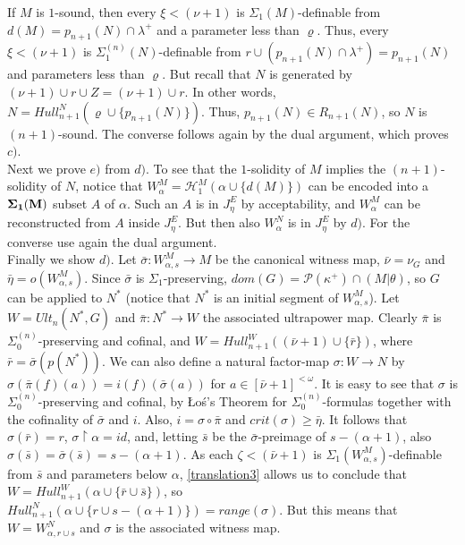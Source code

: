 \documentclass[12pt]{article}
\begin{document}
If $M$ is $1$-sound, then every $\xi < (\nu + 1)$ is $\Sigma_1 (M)$-definable from $d(M) = p_{n+1} (N) \cap \lambda^+$ and a parameter less than $\varrho$.  Thus, every $\xi < (\nu + 1)$ is $\Sigma_1^{(n)}(N)$-definable from $r \cup (p_{n+1} (N) \cap \lambda^+) = p_{n+1}(N)$ and parameters less than $\varrho$. But recall that $N$ is generated by $(\nu + 1) \cup r \cup Z = (\nu + 1) \cup r$.  In other words, $N = Hull_{n+1}^N ( \varrho \cup \{ p_{n+1} (N) \} )$.  Thus, $p_{n+1} (N) \in R_{n+1}(N)$, so $N$ is $(n + 1)$-sound.  The converse follows again by the dual argument, which proves $c)$.\\



Next we prove $e)$ from $d)$.  To see that the $1$-solidity of $M$ implies the $(n+1)$-solidity of $N$, notice that $W_{\alpha}^M = \mathcal{H}_1^M (\alpha \cup \{ d(M) \} )$ can be encoded into a $\bf{\Sigma_1} (M)$ subset $A$ of $\alpha$.  Such an $A$ is in $J_{\eta}^E$ by acceptability, and $W_{\alpha}^M$ can be reconstructed from $A$ inside $J_{\eta}^E$.  But then also $W_{\alpha}^N$ is in $J_{\eta}^E$ by $d)$.  For the converse use again the dual argument.\\



Finally we show $d)$.  Let $\bar{\sigma}: W_{\alpha , s}^M \longrightarrow M$ be the canonical witness map, $\bar{\nu} = \nu_G$ and $\bar{\eta} = o ( W_{\alpha , s}^M)$.  Since $\bar{\sigma}$ is $\Sigma_1$-preserving, $dom( G) = \mathcal{P} ( \kappa^+ ) \cap (M | \theta)$, so $G$ can be applied to $N^*$ (notice that $N^*$ is an initial segment of $W_{\alpha , s}^M$).  Let $W = Ult_n (N^* , G )$ and $\bar{\pi} : N^* \longrightarrow W$ the associated ultrapower map.  Clearly $\bar{\pi}$ is $\Sigma_0^{(n)}$-preserving and cofinal, and $W = Hull_{n+1}^W ( (\bar{\nu} + 1 ) \cup \{ \bar{r} \} )$, where $\bar{r} = \bar{\sigma} ( p (N^*))$.  We can also define a natural factor-map $\sigma : W \longrightarrow N$ by $\sigma ( \bar{\pi} (f)(a)) = i (f) ( \bar{\sigma} (a))$ for $a \in [ \bar{\nu} + 1 ]^{< \omega}$.  It is easy to see that $\sigma$ is $\Sigma_0^{(n)}$-preserving and cofinal, by {\L}o{\'s}'s Theorem for $\Sigma_0^{(n)}$-formulas together with the cofinality of $\bar{\sigma}$ and $i$.  Also, $i = \sigma \circ \bar{\pi}$ and $crit (\sigma ) \geq \bar{\eta}$.  It follows that $\sigma ( \bar{r}) = r$, $\sigma \restriction \alpha = id$, and, letting $\bar{s}$ be the $\bar{\sigma}$-preimage of $s - ( \alpha + 1)$, also $\sigma ( \bar{s}) = \bar{\sigma} ( \bar{s}) = s - (\alpha + 1 )$.  As each $\zeta < (\bar{\nu} + 1)$ is $\Sigma_1 (W_{\alpha , s }^M )$-definable from $\bar{s}$ and parameters below $\alpha$, \ref{translation3} allows us to conclude that $W = Hull_{n+1}^W ( \alpha \cup \{ \bar{r} \cup \bar{s} \} )$, so $Hull_{n+1}^N ( \alpha \cup \{ r \cup s - ( \alpha + 1 ) \} ) = range( \sigma)$.  But this means that $W = W_{\alpha , r \cup s }^N$ and $\sigma$ is the associated witness map.\\
\end{document}
